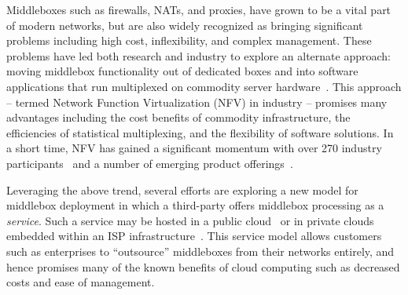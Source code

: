 





Middleboxes such as firewalls, NATs, and proxies, have grown to be a vital part of modern networks, but are 
also widely recognized as bringing significant problems including high cost, inflexibility, and complex management.  
These problems have led both research and industry to explore an alternate approach: moving middlebox functionality out of dedicated boxes and into 
software applications that run multiplexed on commodity server hardware~\cite{mb-manifesto,comb,aplomb,opennf,clickos,flowtags,etsi-nfv,domain20,opnfv}.
This approach -- termed Network Function Virtualization (NFV) in industry -- promises many advantages including the cost benefits of commodity infrastructure, 
the efficiencies of statistical multiplexing, and the flexibility of software solutions. 
In a short time, NFV has gained a significant momentum with over 270 industry participants~\cite{etsi-nfv} and a number of emerging product offerings~\cite{brocade,dell,juniper}.

Leveraging the above trend, several efforts are exploring a new model for middlebox deployment in which a third-party offers middlebox processing as a  
\emph{service}.
Such a service may be hosted in a public cloud~\cite{aplomb,zscaler,aryaka} or in private clouds embedded within an ISP 
infrastructure~\cite{domain20, telefonica}.  
This service model allows customers such as enterprises to ``outsource'' middleboxes from their networks entirely, and hence promises many of the known benefits of cloud computing  such as decreased costs and ease of management.%

